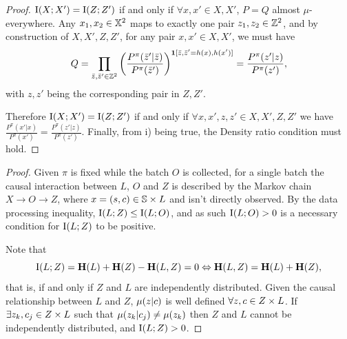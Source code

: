 \begin{proof}
$\text{I}(X;X')=\text{I}(Z;Z')$ if and only if  $\forall x,x' \in X,X'$, $P=Q$ almost $\mu$-everywhere. Any $x_1,x_2\in {\mathbb{X}}^2$  maps to exactly one pair $z_1,z_2\in{\mathbb{Z}}^2$, and by construction of $X,X',Z,Z'$, for any pair $x,x'\in X,X'$, we must have 
\begin{equation*}
    Q=\prod_{\bar{z},\bar{z}'\in{\mathbb{Z}}^2}\bigg(\frac{P^\pi(\bar{z}'|\bar{z})}{P^\pi(\bar{z}')}\bigg)^{\bm{1}[\bar{z},\bar{z}'=h(x),h(x')]} = \frac{P^\pi(z'|z)}{P^\pi(z')},
\end{equation*}
with $z,z'$ being the corresponding pair in $Z,Z'$.

Therefore $\text{I}(X;X') = \text{I}(Z;Z')$ if and only if $\forall x,x',z,z'\in X,X',Z,Z'$ we have $\frac{P^\pi(x'|x)}{P^\pi(x')}=\frac{P^\pi(z'|z)}{P^\pi(z')}$. Finally, from i) being true, the Density ratio condition must hold.
\end{proof}


\LEMmiZLcond*
\begin{proof}
    Given $\pi$ is fixed while the batch $O$ is collected, for a single batch the causal interaction between $L$, $O$ and $Z$ is described by the Markov chain $X \rightarrow O \rightarrow Z$, where $x=(s,c) \in {\mathbb{S}} \times L$ and isn't directly observed. By the data processing inequality, $\text{I}(L;Z) \leq \text{I}(L;O)$, and as such $\text{I}(L;O)>0$ is a necessary condition for $\text{I}(L;Z)$ to be positive.

    Note that
    \begin{equation*}
        \text{I}(L;Z) = \mathbf{H}(L) + \mathbf{H}(Z) - \mathbf{H}(L,Z) = 0 \Leftrightarrow \mathbf{H}(L,Z) = \mathbf{H}(L) + \mathbf{H}(Z),
    \end{equation*}
    that is, if and only if $Z$ and $L$ are independently distributed. Given the causal relationship between $L$ and $Z$, $\mu(z|c)$ is well defined $\forall z,c \in Z\times L$. If $\exists z_k,c_j \in Z\times L$ such that $\mu(z_k|c_j) \neq \mu(z_k)$ then $Z$ and $L$ cannot be independently distributed, and $\text{I}(L;Z)>0$.
\end{proof}

